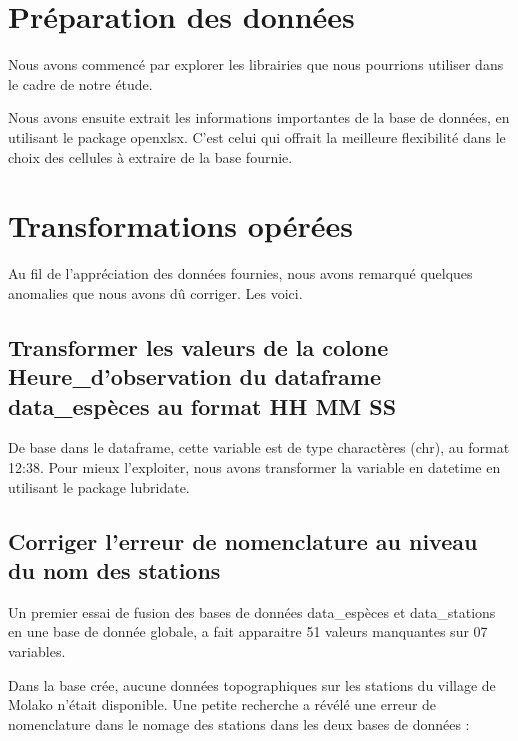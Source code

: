 \documentclass[
]{book}
\begin{document}
\section{Préparation des données}\label{pruxe9paration-des-donnuxe9es}

Nous avons commencé par explorer les librairies que nous pourrions utiliser dans le cadre de notre étude.

Nous avons ensuite extrait les informations importantes de la base de données, en utilisant le package openxlsx. C'est celui qui offrait la meilleure flexibilité dans le choix des cellules à extraire de la base fournie.

\section{Transformations opérées}\label{transformations-opuxe9ruxe9es}

Au fil de l'appréciation des données fournies, nous avons remarqué quelques anomalies que nous avons dû corriger. Les voici.

\subsection{Transformer les valeurs de la colone Heure\_d'observation du dataframe data\_espèces au format HH MM SS}\label{transformer-les-valeurs-de-la-colone-heure_dobservation-du-dataframe-data_espuxe8ces-au-format-hh-mm-ss}

De base dans le dataframe, cette variable est de type charactères (chr), au format 12:38. Pour mieux l'exploiter, nous avons transformer la variable en datetime en utilisant le package lubridate.

\subsection{Corriger l'erreur de nomenclature au niveau du nom des stations}\label{corriger-lerreur-de-nomenclature-au-niveau-du-nom-des-stations}

Un premier essai de fusion des bases de données data\_espèces et data\_stations en une base de donnée globale, a fait apparaitre 51 valeurs manquantes sur 07 variables.

Dans la base crée, aucune données topographiques sur les stations du village de Molako n'était disponible. Une petite recherche a révélé une erreur de nomenclature dans le nomage des stations dans les deux bases de données :
\end{document}
